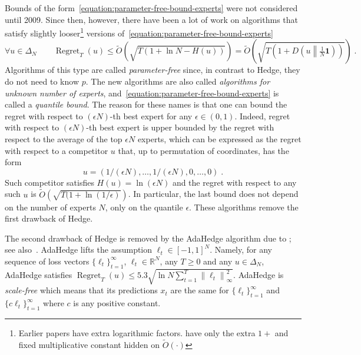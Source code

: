 \documentclass{colt2016} %
\DeclareMathOperator{\Regret}{Regret}
\newcommand{\R}{\mathbb{R}}     %
\newcommand{\KL}[2]{D\left({#1}\middle\|{#2}\right)}  %
\newcommand{\norm}[1]{\left\|{#1}\right\|}
\newcommand{\indicator}{\mathbf{1}}
\begin{document}
Bounds of the form~\eqref{equation:parameter-free-bound-experts} were not
considered until 2009. Since then, however, there have been a lot of work
\citep{Chaudhuri-Freund-Hsu-2009, Chernov-Vovk-2010, Koolen-van-Erven-2015,
Luo-Schapire-2014, Luo-Schapire-2015, Foster-Rakhlin-Sridharan-2015,
Orabona-Pal-2016-parameter-free} on algorithms that satisfy slightly
looser\footnote{Earlier papers have extra logarithmic factors.
\citet{Foster-Rakhlin-Sridharan-2015, Orabona-Pal-2016-parameter-free} have
only the extra $1+$ and fixed multiplicative constant hidden on $\widetilde
O(\cdot)$} versions of~\eqref{equation:parameter-free-bound-experts}
\begin{equation}
\label{equation:parameter-free-bound-experts-2}
\forall u \in \Delta_N \qquad \Regret_T(u) \le \widetilde O(\sqrt{T (1 + \ln N - H(u))}) = \widetilde O\left(\sqrt{T \left(1 + \KL{u}{\tfrac{1}{N}\indicator} \right)} \right) \; .
\end{equation}
Algorithms of this type are called \emph{parameter-free} since, in contrast to
Hedge, they do not need to know $p$.  The new algorithms are also called
\emph{algorithms for unknown number of experts},
and~\eqref{equation:parameter-free-bound-experts} is called a \emph{quantile
bound}. The reason for these names is that one can bound the regret with
respect to $(\epsilon N)$-th best expert for any $\epsilon \in (0,1)$. Indeed,
regret with respect to $(\epsilon N)$-th best expert is upper bounded by the
regret with respect to the average of the top $\epsilon N$ experts, which can
be expressed as the regret with respect to a competitor $u$ that, up to
permutation of coordinates, has the form
$$
u = \left( 1/(\epsilon N), \dots, 1/(\epsilon N), 0, \dots, 0 \right) \; .
$$
Such competitor satisfies $H(u) = \ln (\epsilon N)$ and the regret with respect
to any such $u$ is $\widetilde O(\sqrt{T (1 + \ln(1/\epsilon)})$. In
particular, the last bound does not depend on the number of experts $N$, only
on the quantile $\epsilon$.  These algorithms remove the first drawback of
Hedge.

The second drawback of Hedge is removed by the AdaHedge algorithm due to
\cite{de-Rooij-van-Erven-Grunwald-Koolen-2014}; see
also~\citep{Orabona-Pal-2016-parameter-free}. AdaHedge lifts the assumption
$\ell_t \in [-1,1]^N$. Namely, for any sequence of loss vectors
$\{\ell_t\}_{t=1}^\infty$, $\ell_t \in \R^N$, any $T \ge 0$ and any $u \in
\Delta_N$, AdaHedge satisfies $\Regret_T(u) \le 5.3 \sqrt{\ln N \sum_{t=1}^T
\norm{\ell_t}_\infty^2}$. AdaHedge is \emph{scale-free} which means that its
predictions $x_t$ are the same for $\{\ell_t\}_{t=1}^\infty$ and $\{c
\ell_t\}_{t=1}^\infty$ where $c$ is any positive constant.
\end{document}
